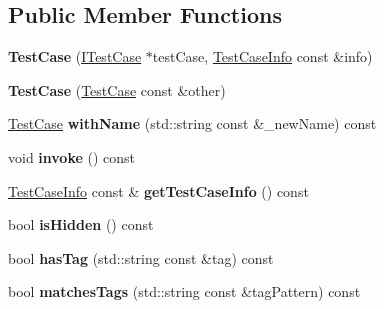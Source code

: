 \subsection*{Public Member Functions}
\begin{DoxyCompactItemize}
\item 
\hypertarget{class_catch_1_1_test_case_a03a5b913484681bd6d398dc5e9c2a907}{{\bfseries Test\-Case} (\hyperlink{struct_catch_1_1_i_test_case}{I\-Test\-Case} $\ast$test\-Case, \hyperlink{struct_catch_1_1_test_case_info}{Test\-Case\-Info} const \&info)}\label{class_catch_1_1_test_case_a03a5b913484681bd6d398dc5e9c2a907}

\item 
\hypertarget{class_catch_1_1_test_case_ac0011d3789edc3e44edb41f13c4775a0}{{\bfseries Test\-Case} (\hyperlink{class_catch_1_1_test_case}{Test\-Case} const \&other)}\label{class_catch_1_1_test_case_ac0011d3789edc3e44edb41f13c4775a0}

\item 
\hypertarget{class_catch_1_1_test_case_ab6dbc6c82b7c1680013c67bdedccfc8e}{\hyperlink{class_catch_1_1_test_case}{Test\-Case} {\bfseries with\-Name} (std\-::string const \&\-\_\-new\-Name) const }\label{class_catch_1_1_test_case_ab6dbc6c82b7c1680013c67bdedccfc8e}

\item 
\hypertarget{class_catch_1_1_test_case_aac2e028135cc88c3e3aac04650960a6c}{void {\bfseries invoke} () const }\label{class_catch_1_1_test_case_aac2e028135cc88c3e3aac04650960a6c}

\item 
\hypertarget{class_catch_1_1_test_case_a25c03661ab092431cdff10df5c58a5a7}{\hyperlink{struct_catch_1_1_test_case_info}{Test\-Case\-Info} const \& {\bfseries get\-Test\-Case\-Info} () const }\label{class_catch_1_1_test_case_a25c03661ab092431cdff10df5c58a5a7}

\item 
\hypertarget{class_catch_1_1_test_case_a61477cce84066cb77d4eeef5a1470a36}{bool {\bfseries is\-Hidden} () const }\label{class_catch_1_1_test_case_a61477cce84066cb77d4eeef5a1470a36}

\item 
\hypertarget{class_catch_1_1_test_case_ae3c1a0898ee9936cd1d4f207e3903308}{bool {\bfseries has\-Tag} (std\-::string const \&tag) const }\label{class_catch_1_1_test_case_ae3c1a0898ee9936cd1d4f207e3903308}

\item 
\hypertarget{class_catch_1_1_test_case_a89cf3a144b6f256b6a533a631f7a8b0c}{bool {\bfseries matches\-Tags} (std\-::string const \&tag\-Pattern) const }\label{class_catch_1_1_test_case_a89cf3a144b6f256b6a533a631f7a8b0c}


\end{DoxyCompactItemize}
